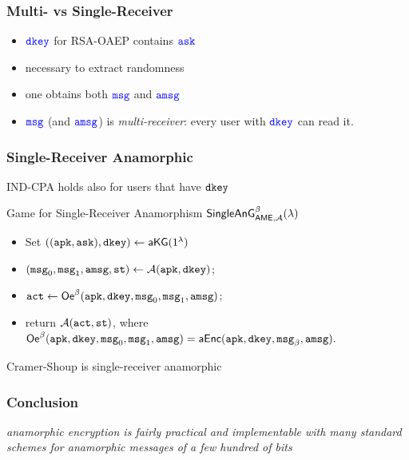 \documentclass[]{beamer}
\begin{document}
\begin{frame}
\frametitle{Multi- vs Single-Receiver}
\begin{itemize}
\item $\color{blue} {\mathtt{dkey}}$ for RSA-OAEP contains $\color{blue} {\mathtt{a}}{\mathtt{sk}}$
\item necessary to extract randomness
\item one obtains both $\color{blue} {\mathtt{msg}}$ and $\color{blue} {\mathtt{a}}{\mathtt{msg}}$ 
\item $\color{blue} {\mathtt{msg}}$ (and $\color{blue} {\mathtt{a}}{\mathtt{msg}}$) is
{\color{teal}\em multi-receiver}:
every user with $\color{blue}{\mathtt{dkey}}$ can read it.
\end{itemize}
\end{frame}

\begin{frame}
\frametitle{Single-Receiver Anamorphic}
IND-CPA holds also for users that have ${\mathtt{dkey}}$

\begin{center}
\begin{block}{Game for Single-Receiver Anamorphism}
\color{brown}
${\mathsf{SingleAnG}}_{{\mathsf{AME}},\mathcal{A}}^\beta(\lambda)$
\begin{itemize}
\color{brown}
\item Set $(({\mathtt{a}}{\mathtt{pk}},{\mathtt{a}}{\mathtt{sk}}),{\mathtt{dkey}})\leftarrow{\mathsf{a}}{\mathsf{KG}}(1^\lambda)$
\item $({\mathtt{msg}}_0,{\mathtt{msg}}_1,{\mathtt{a}}{\mathtt{msg}},\mathtt{st})\leftarrow\mathcal{A}({\mathtt{a}}{\mathtt{pk}},{\mathtt{dkey}})$;
\item ${\mathtt{a}}{\mathtt{ct}}\leftarrow{{\mathsf{Oe}}^\beta({\mathtt{a}}{\mathtt{pk}},{\mathtt{dkey}},{\mathtt{msg}}_0,{\mathtt{msg}}_1,{\mathtt{a}}{\mathtt{msg}})}$;
\item return $\mathcal{A}({\mathtt{a}}{\mathtt{ct}},\mathtt{st})$,
where
\\
${\mathsf{Oe}}^\beta({\mathtt{a}}{\mathtt{pk}},{\mathtt{dkey}},{\mathtt{msg}}_0,{\mathtt{msg}}_1,{\mathtt{a}}{\mathtt{msg}})={\mathsf{a}}{\mathsf{Enc}}({\mathtt{a}}{\mathtt{pk}},{\mathtt{dkey}},{\mathtt{msg}}_\beta,{\mathtt{a}}{\mathtt{msg}}).$
\end{itemize}
\end{block}
\end{center}

\begin{theorem}
Cramer-Shoup is single-receiver anamorphic
\end{theorem}
\end{frame}
\begin{frame}
\frametitle{Conclusion}

\vfill
{\em \color{teal}
anamorphic encryption is fairly practical and implementable with many 
standard schemes for anamorphic messages  of a few hundred of bits }

\vfill

\end{frame}
\end{document}
